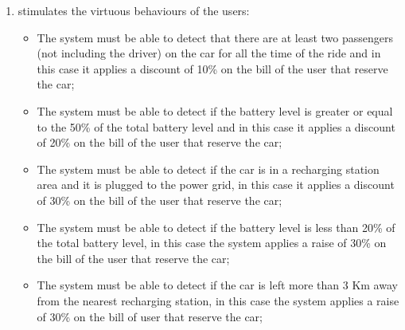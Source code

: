 \begin{enumerate}
\item stimulates  the virtuous behaviours of the users:
\begin{itemize}
\item The system must be able to detect that there are at least two passengers (not including the driver) on the car for all the time of the ride and in this case it applies a discount of 10\% on the bill of the user that reserve the car;
\item The system must be able to detect if  the battery level is greater or equal to the 50\% of the total battery level and in this case it applies a discount of 20\% on the bill of the user that reserve the car;
\item The system must be able to detect if the car is in a recharging station area and it is plugged to the power grid, in this case it applies a discount of 30\% on the bill of the user that reserve the car;
\item The system must be able to detect if the battery level is less than 20\% of the total battery level, in this case the system applies a raise of 30\% on the bill of the user that reserve the car;
\item The system must be able to detect if the car is left more than 3 Km away from the nearest recharging station, in this case the system applies a raise of 30\% on the bill of user that reserve the car;
\end{itemize}

\end{enumerate}